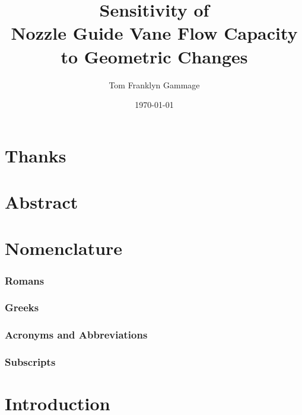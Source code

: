 \documentclass[a4paper, 11pt, oneside]{report}
\title{Sensitivity of\\Nozzle Guide Vane Flow Capacity\\to Geometric Changes}
\author{Tom Franklyn Gammage}
\date{\mydate\today}
\begin{document}
\maketitle

\chapter*{Thanks}

\chapter*{Abstract}

\tableofcontents
\listoffigures
\listoftables

\chapter*{Nomenclature}
\subsection*{Romans}
\subsection*{Greeks}
\subsection*{Acronyms and Abbreviations}
\subsection*{Subscripts}



\chapter{Introduction}


\end{document}
